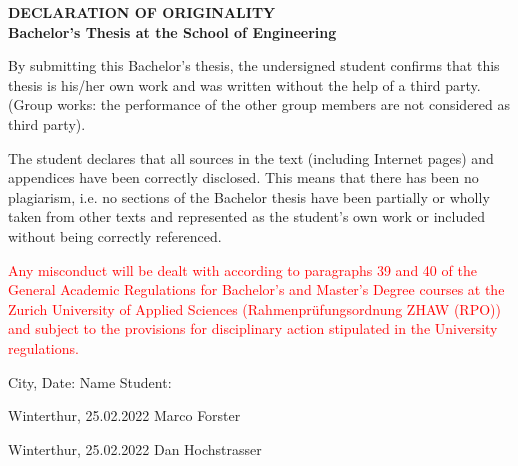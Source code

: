 \topskip 0pt
\vspace*{\fill}

\textbf{DECLARATION OF ORIGINALITY} \\
\textbf{Bachelor’s Thesis at the School of Engineering}

By submitting this Bachelor’s thesis, the undersigned student confirms that this thesis is his/her own work and was written without the help of a third party. (Group works: the performance of the other group members are not considered as third party).

The student declares that all sources in the text (including Internet pages) and appendices have been correctly disclosed. This means that there has been no plagiarism, i.e. no sections of the Bachelor thesis have been partially or wholly taken from other texts and represented as the student’s own work or included without being correctly referenced.

\textcolor{red}{Any misconduct will be dealt with according to paragraphs 39 and 40 of the General Academic Regulations for Bachelor’s and Master’s Degree courses at the Zurich University of Applied Sciences (Rahmenprüfungsordnung ZHAW (RPO)) and subject to the provisions for disciplinary action stipulated in the University regulations.}

\vspace{15mm}

City, Date: \hspace{25mm} Name Student:

Winterthur, 25.02.2022 \hspace{4mm} Marco Forster

Winterthur, 25.02.2022 \hspace{4mm} Dan Hochstrasser

\vspace*{\fill}
